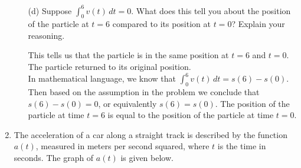 \documentclass[11pt]{article}
\begin{document}
\begin{enumerate}
\begin{enumerate}
\vspace{2cm}

\item[(d)] Suppose $\displaystyle \int_0^6 v(t)\,dt = 0$.  
What does this tell you about the position of the particle at $t=6$ compared to its position at $t=0$?  
Explain your reasoning.

{\color{blue} This tells us that the particle is in the same position at $t=6$ and $t=0$. The particle returned to its original position.\\
In mathematical language, we know that $\int_0^6v(t)\,dt=s(6)-s(0)$. Then based on the assumption in the problem we conclude that $s(6)-s(0)=0$, or equivalently $s(6)=s(0)$. The position of the particle at time $t=6$ is equal to the position of the particle at time $t=0$.}

\end{enumerate}



\newpage


\item The acceleration of a car along a straight track is described by the function $a(t)$, measured in meters per second squared, where $t$ is the time in seconds. The graph of $a(t)$ is given below.

\begin{center}
\end{center}


\end{enumerate}
\end{document}
